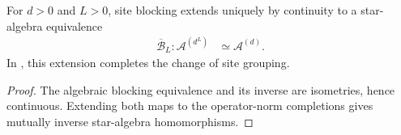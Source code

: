 \begin{definition}
    \label{def:qca_quasi_local_blocking}
    \leanok
    For $d>0$ and $L>0$, site blocking extends uniquely by continuity to a
    star-algebra equivalence
    \begin{align}
        \overline{\mathcal B}_L:
        \mathcal A^{(d^L)} & \simeq\mathcal A^{(d)}.
    \end{align}
    In \cite[lines~2308 and 2313--2320]{Cirac2017MPU}, this extension completes the change of site
    grouping.
\end{definition}

\begin{proof}\leanok
    The algebraic blocking equivalence and its inverse are isometries, hence
    continuous.  Extending both maps to the operator-norm completions gives
    mutually inverse star-algebra homomorphisms.
\end{proof}

